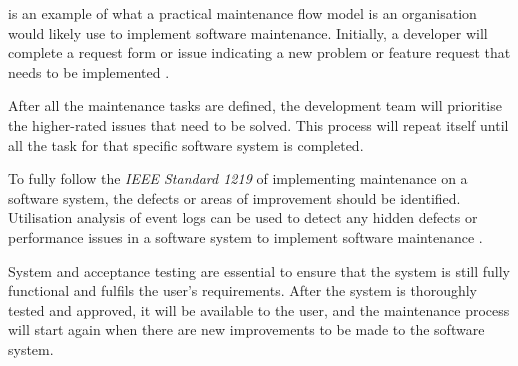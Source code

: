  is an example of what a practical maintenance flow model is an organisation would likely use to implement software maintenance. Initially, a developer will complete a request form or issue indicating a new problem or feature request that needs to be implemented \cite{Tang2010}.\par After all the maintenance tasks are defined, the development team will prioritise the higher-rated issues that need to be solved. This process will repeat itself until all the task for that specific software system is completed.\par To fully follow the \textit{IEEE Standard 1219} of implementing maintenance on a software system, the defects or areas of improvement should be identified. Utilisation analysis of event logs can be used to detect any hidden defects or performance issues in a software system to implement software maintenance \cite{Cinque2013, Rong2018a, Levin2019}.\par System and acceptance testing are essential to ensure that the system is still fully functional and fulfils the user's requirements. After the system is thoroughly tested and approved, it will be available to the user, and the maintenance process will start again when there are new improvements to be made to the software system.


